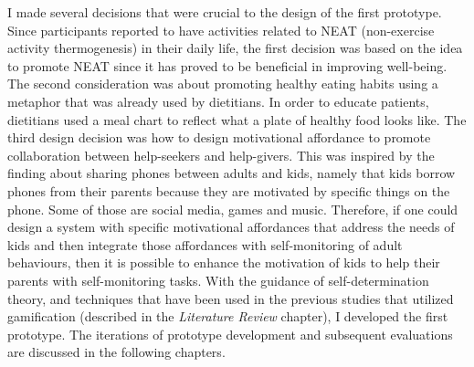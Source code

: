 I made several decisions that were crucial to the design of the first prototype.  Since participants reported to have activities related to NEAT (non-exercise activity thermogenesis) in their daily life, the first decision was based on the idea to promote NEAT since it has proved to be beneficial in improving well-being. The second consideration was about  promoting healthy eating habits using a metaphor that was already used by dietitians. In order to educate patients, dietitians used a meal chart to reflect what a plate of healthy food looks like. The third design decision was how to design motivational affordance to promote collaboration between help-seekers and help-givers. This was inspired by the finding about sharing phones between adults and kids, namely that kids borrow phones from their parents because they are motivated by specific things on the phone. Some of those are social media, games and music. Therefore, if one could design a system with specific motivational affordances that address the needs of kids and then integrate those affordances with self-monitoring of adult behaviours, then it is possible to enhance the motivation of kids to help their parents with self-monitoring tasks. With the guidance of self-determination theory, and techniques that have been used in the previous studies that utilized gamification (described in the \emph{Literature Review} chapter), I developed the first prototype. The iterations of prototype development and subsequent evaluations are discussed in the following chapters.

\begin{flushright}
\end{flushright}